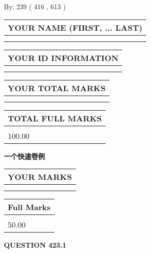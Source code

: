 \documentclass{ctexart}
\begin{document}
   
\hspace{1.0in} By: 
 239 ( 416 ,  613 )
   
   
   
   
\newpage 
\setcounter{page}{ 
   423001 } 
   
   
   
   
\noindent\begin{tabular}{|l|}
\hline
YOUR NAME (FIRST, ... LAST)  \\
\hline
 \\ 
 \\ 
\hline
\end{tabular}
\hspace{0.05in} \begin{tabular}{|l|}
\hline
 YOUR   ID   INFORMATION  \\
\hline
 \\ 
 \\ 
\hline
\end{tabular}
   
   
\vspace{0.2in}\noindent\begin{tabular}{|l|}
\hline
YOUR TOTAL MARKS  \\
\hline
 \\ 
 \\ 
\hline
\end{tabular}
\hspace{0.05in} \begin{tabular}{|l|}
\hline
TOTAL FULL MARKS  \\
\hline
 \\ 
100.00 \\
\hline
\end{tabular}
   
   
 \vspace{0.2in}
{\LARGE {\textbf{ 一个快速卷例}}}
   
   
  
\vspace{0.2in}
  
\noindent\begin{tabular}{|l|}
\hline
 YOUR MARKS  \\
\hline
 \\ 
 \\ 
\hline
\end{tabular}
\hspace{0.05in} \begin{tabular}{|l|}
\hline
 Full Marks  \\
\hline
 \\ 
50.00 \\
\hline
\end{tabular}
{\textbf{\Large{QUESTION
423.1 
}}}
  
\end{document}
